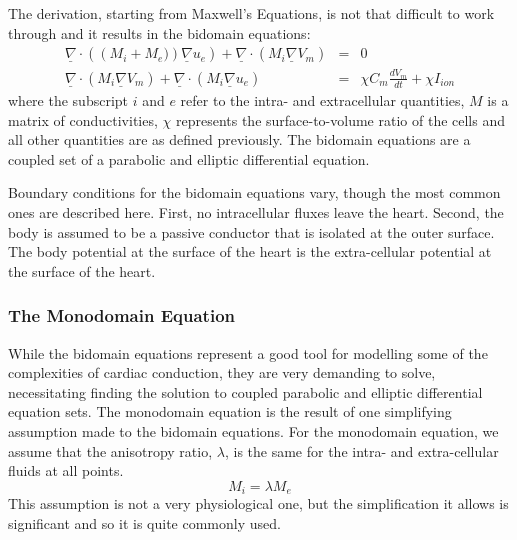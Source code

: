 The derivation, starting from Maxwell's Equations, is not that difficult to work
through and it results in the bidomain equations:
\begin{subequations}
\label{eqn:intro:math:bidom}
\begin{align}
\underline{\nabla}\cdot\left(\left(M_{i}+M_{e})\right)\underline{\nabla}u_{e}\right) + \underline{\nabla}\cdot\left( M_{i}\underline{\nabla}V_{m}\right) &=& 0
\label{eqn:intro:math:bidom1}\\
\underline{\nabla}\cdot\left(M_{i}\underline{\nabla}V_{m}\right) + \underline{\nabla}\cdot\left(M_{i}\underline{\nabla}u_{e}\right) &=& \chi C_{m}\frac{dV_{m}}{dt} + \chi{I_{ion}}
\label{eqn:intro:math:bidom2}
\end{align}
\end{subequations}
where the subscript $i$ and $e$ refer to the intra- and extracellular quantities, $M$ is a matrix of conductivities, $\chi$ represents the surface-to-volume ratio of the cells and all other quantities are as defined previously.
The bidomain equations are a coupled set of a parabolic and elliptic differential equation.

Boundary conditions for the bidomain equations vary, though the most common ones are described here.
First, no intracellular fluxes leave the heart.
Second, the body is assumed to be a passive conductor that is isolated at the outer surface.
The body potential at the surface of the heart is the extra-cellular potential at the surface of the heart.

\subsubsection{The Monodomain Equation}
\label{sec:intro:math:mono}

While the bidomain equations represent a good tool for modelling some of the complexities of cardiac conduction, they are very demanding to solve, necessitating finding the solution to coupled parabolic and elliptic differential equation sets.
The monodomain equation is the result of one simplifying assumption made to the bidomain equations.
For the monodomain equation, we assume that the anisotropy ratio, $\lambda$, is the same for the intra- and extra-cellular fluids at all points.
\begin{equation}
M_{i} = {\lambda}M_{e}
\label{eqn:intro:math:mratio}
\end{equation}
This assumption is not a very physiological one, but the simplification it
allows is significant and so it is quite commonly used.

